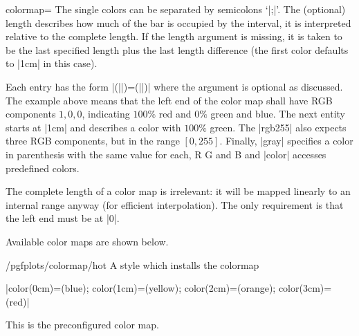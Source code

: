 \begin{pgfplotskey}{colormap=}
\noindent The single colors can be separated by semicolons `|;|'. The (optional) length describes how much of the bar is occupied by the interval, it is interpreted relative to the complete length. If the length argument is missing, it is taken to be the last specified length plus the last length difference (the first color defaults to |1cm| in this case). 

Each entry has the form |(||)=(||)| where the  argument is optional as discussed. The example above means that the left end of the color map shall have RGB components $1,0,0$, indicating $100\%$ red and $0\%$ green and blue. The next entity starts at |1cm| and describes a color with $100\%$ green. The |rgb255| also expects three RGB components, but in the range $[0,255]$. Finally, |gray| specifies a color in parenthesis with the same value for each, R G and B and |color| accesses predefined colors.

\begin{codeexample}[]
\end{codeexample}
The complete length of a color map is irrelevant: it will be mapped linearly to an internal range anyway (for efficient interpolation). The only requirement is that the left end must be at |0|.

Available color maps are shown below.

\end{pgfplotskey}

\begin{stylekey}{/pgfplots/colormap/hot}
	A style which installs the colormap

	|{color(0cm)=(blue); color(1cm)=(yellow); color(2cm)=(orange); color(3cm)=(red)}|


	This is the preconfigured color map.
\end{stylekey}

